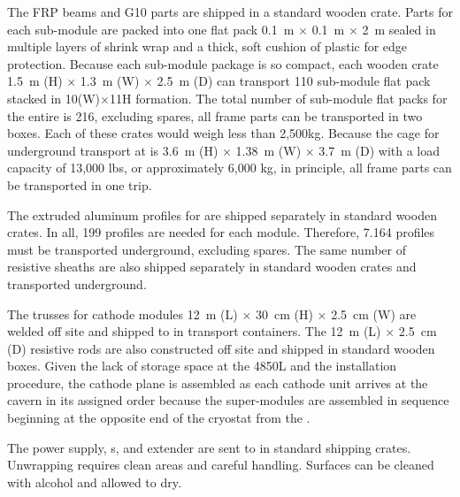 The  FRP beams and G10 parts are shipped in a standard wooden crate.  Parts for each sub-module are packed into one %
flat pack \SI{0.1}{\m} $\times$ \SI{0.1}{\m} $\times$ \SI{2}{\m} sealed in multiple layers of shrink wrap and a thick, soft cushion of plastic for edge protection. Because each sub-module package is so compact, each wooden crate \SI{1.5}{\m} (H) $\times$ \SI{1.3}{\m} (W) $\times$ \SI{2.5}{\m} (D) can transport 110 sub-module flat pack stacked in 10(W)$\times$11{H} formation.
The total number of sub-module flat packs for the entire  is \num{216}, excluding spares, all  frame parts can be transported in two boxes. 
Each of these crates would weigh less than 2,500kg.
Because the cage for underground transport at \surf is 
\SI{3.6}{\m} (H) $\times$ \SI{1.38}{\m} (W) $\times$ \SI{3.7}{\m} (D) with a load capacity of 13,000 lbs, or approximately 6,000 kg, in principle, all  frame parts can be transported  in one trip.

The extruded aluminum profiles for  are shipped separately in  standard wooden crates. In all, \num{199} profiles are needed for each \tpcheight module. Therefore, \num{7,164} profiles must be transported underground, excluding spares. The same number of resistive sheaths are also shipped separately in standard wooden crates and transported underground. 

The trusses for cathode modules \SI{12}{\m} (L) $\times$ \SI{30}{\cm} (H) $\times$ \SI{2.5}{\cm} (W) are welded off site and shipped to \surf in transport containers. 
The \SI{12}{\m} (L) $\times$ \SI{2.5}{\cm} (D) resistive rods are also constructed off site and shipped in standard wooden boxes.  Given the lack of storage space at the 4850L and the installation procedure, the cathode plane is assembled as each cathode unit arrives at the cavern in its assigned order because the  super-modules are assembled in sequence beginning at the opposite end of the cryostat from the .

The power supply, \fdth{}s, and  extender are sent to \surf in standard shipping crates. Unwrapping requires clean areas and careful handling. Surfaces can be cleaned with alcohol and allowed to dry.

